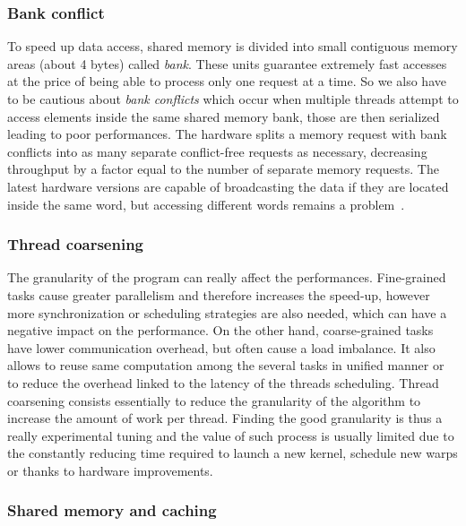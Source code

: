 \subsubsection{Bank conflict}


To speed up data access, shared memory is divided into small contiguous memory areas (about 4 bytes) called \textit{bank}. These units guarantee extremely fast accesses at the price of being able to process only one request at a time. So we also have to be cautious about \textit{bank conflicts} which occur when multiple threads attempt to access elements inside the same shared memory bank, those are then serialized leading to poor performances. The hardware splits a memory request with bank conflicts into as many separate conflict-free requests as necessary, decreasing throughput by a factor equal to the number of separate memory requests. The latest hardware versions are capable of broadcasting the data if they are located inside the same word, but accessing different words remains a problem~\cite{micikevicius2013performance}.

\subsubsection{Thread coarsening}

The granularity of the program can really affect the performances. Fine-grained tasks cause greater parallelism and therefore increases the speed-up, however more synchronization or scheduling strategies are also needed, which can have a negative impact on the performance. On the other hand, coarse-grained tasks have lower communication overhead, but often cause a load imbalance. It also allows to reuse same computation among the several tasks in unified manner or to reduce the overhead linked to the latency of the threads scheduling. Thread coarsening consists essentially to reduce the granularity of the algorithm to increase the amount of work per thread. Finding the good granularity is thus a really experimental tuning and the value of such process is usually limited due to the constantly reducing time required to launch a new kernel, schedule new warps or thanks to hardware improvements.

\subsubsection{Shared memory and caching}

